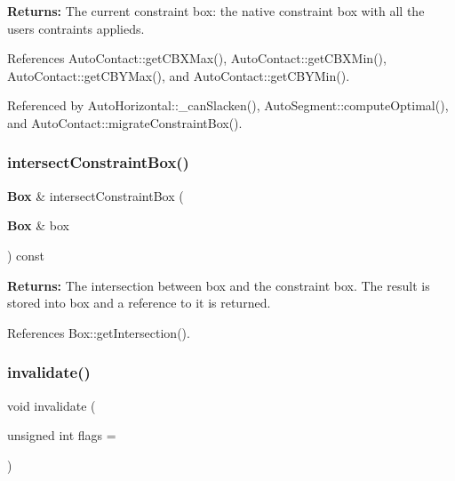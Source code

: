 {\bfseries Returns\+:} The current constraint box\+: the native constraint box with all the user\textquotesingle{}s contraints applieds. 

References Auto\+Contact\+::get\+C\+B\+X\+Max(), Auto\+Contact\+::get\+C\+B\+X\+Min(), Auto\+Contact\+::get\+C\+B\+Y\+Max(), and Auto\+Contact\+::get\+C\+B\+Y\+Min().



Referenced by Auto\+Horizontal\+::\+\_\+can\+Slacken(), Auto\+Segment\+::compute\+Optimal(), and Auto\+Contact\+::migrate\+Constraint\+Box().

\mbox{\label{classKatabatic_1_1AutoContact_ac2fe070a286356a24baa466b4fe5b74d}} 
\subsubsection{\texorpdfstring{intersect\+Constraint\+Box()}{intersectConstraintBox()}}
{\footnotesize\ttfamily \textbf{ Box} \& intersect\+Constraint\+Box (\begin{DoxyParamCaption}\item[{\textbf{ Box} \&}]{box }\end{DoxyParamCaption}) const}

{\bfseries Returns\+:} The intersection between {\ttfamily box} and the constraint box. The result is stored into {\ttfamily box} and a reference to it is returned. 

References Box\+::get\+Intersection().

\mbox{\label{classKatabatic_1_1AutoContact_aabac50fd9b8e1bba7289573973658d18}} 
\subsubsection{\texorpdfstring{invalidate()}{invalidate()}}
{\footnotesize\ttfamily void invalidate (\begin{DoxyParamCaption}\item[{unsigned int}]{flags = {} }\end{DoxyParamCaption})}

